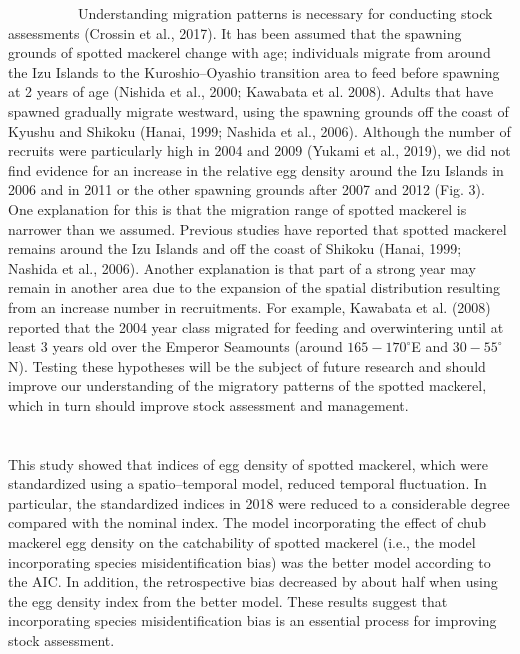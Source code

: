 \documentclass[12pt]{article}
\begin{document}
\begin{linenumbers}
\ \ \ \ \ \ \ \ \ \ 
Understanding migration patterns is necessary for conducting stock assessments (Crossin et al., 2017). It has been assumed that the spawning grounds of spotted mackerel change with age; individuals migrate from around the Izu Islands to the Kuroshio--Oyashio transition area to feed before spawning at 2 years of age (Nishida et al., 2000; Kawabata et al. 2008). Adults that have spawned gradually migrate westward, using the spawning grounds off the coast of Kyushu and Shikoku (Hanai, 1999; Nashida et al., 2006). Although the number of recruits were particularly high in 2004 and 2009 (Yukami et al., 2019), we did not find evidence for an increase in the relative egg density around the Izu Islands in 2006 and in 2011 or the other spawning grounds after 2007 and 2012 (Fig. 3). One explanation for this is that the migration range of spotted mackerel is narrower than we assumed. Previous studies have reported that spotted mackerel remains around the Izu Islands and off the coast of Shikoku (Hanai, 1999; Nashida et al., 2006). Another explanation is that part of a strong year may remain in another area due to the expansion of the spatial distribution resulting from an increase number in recruitments. For example, Kawabata et al. (2008) reported that the 2004 year class migrated for feeding and overwintering until at least 3 years old over the Emperor Seamounts (around $\textrm{165}-\textrm{170}^{\circ}$E and $\textrm{30}-\textrm{55}^{\circ}$N). Testing these hypotheses will be the subject of future research and should improve our understanding of the migratory patterns of the spotted mackerel, which in turn should improve stock assessment and management.
\ \\

\ \\
\\
This study showed that indices of egg density of spotted mackerel, which were standardized using a spatio--temporal model, reduced temporal fluctuation. In particular, the standardized indices in 2018 were reduced to a considerable degree compared with the nominal index. The model incorporating the effect of chub mackerel egg density on the catchability of spotted mackerel (i.e., the model incorporating species misidentification bias) was the better model according to the AIC. In addition, the retrospective bias decreased by about half when using the egg density index from the better model. These results suggest that incorporating species misidentification bias is an essential process for improving stock assessment. 


\end{linenumbers}
\end{document}
